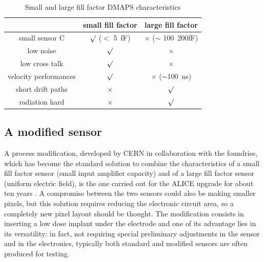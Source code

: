       \begin{table}
         \begin{center}
         \begin{tabular}{|c | c |c |}
         \hline
         & small fill factor & large fill factor\\
         \hline
         \hline
         small sensor C & $\surd$ ($<$ \SI{5}{fF}) & $\times$ ($\sim$ \SI{100}{200}{fF})\\
         low noise & $\surd$ & $\times$\\
         low cross talk & $\surd$ & $\times$ \\
         velocity performances & $\surd$ & $\times$ ($\sim$\SI{100}{ns})\\
         short drift paths & $\times$ & $\surd$ \\
         radiation hard & $\times$ & $\surd$ \\
         \hline
         \end{tabular}
         \caption{Small and large fill factor DMAPS characteristics}
         \label{tab:DMAPS_large_small_fillfactor}
         \end{center}
      \end{table}

   \subsection{A modified sensor}\label{chap:a_modified_sensor}
      A process modification, developed by CERN in collaboration with the foundries, which has become the standard solution to combine the characteristics of a small fill factor sensor (small input amplifier capacity) and of a large fill factor sensor (uniform electric field), is the one carried out for the ALICE upgrade for about ten years \cite{AProcessModification}.
      A compromise between the two sensors could also be making smaller pixels, but this solution requires reducing the electronic circuit area, so a completely new pixel layout should be thought. The modification consists in inserting a low dose implant under the electrode and one of its advantage lies in its versatility: in fact,
      not requiring special preliminary adjustments in the sensor and in the electronics, typically both standard and modified sensors are often produced for testing.

